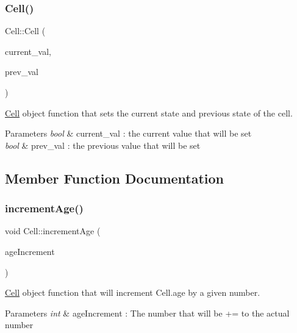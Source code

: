\subsubsection{\texorpdfstring{Cell()}{Cell()}}
{\footnotesize\ttfamily Cell\+::\+Cell (\begin{DoxyParamCaption}\item[{bool}]{current\+\_\+val,  }\item[{bool}]{prev\+\_\+val }\end{DoxyParamCaption})}



\mbox{\hyperlink{class_cell}{Cell}} object function that sets the current state and previous state of the cell. 


\begin{DoxyParams}{Parameters}
{\em bool} & current\+\_\+val \+: the current value that will be set \\
\hline
{\em bool} & prev\+\_\+val \+: the previous value that will be set \\
\hline
\end{DoxyParams}


\subsection{Member Function Documentation}
\mbox{\label{class_cell_a289682e9815c9e72f85ee21153688d3f}} 
\subsubsection{\texorpdfstring{increment\+Age()}{incrementAge()}}
{\footnotesize\ttfamily void Cell\+::increment\+Age (\begin{DoxyParamCaption}\item[{int}]{age\+Increment }\end{DoxyParamCaption})}



\mbox{\hyperlink{class_cell}{Cell}} object function that will increment Cell.\+age by a given number. 


\begin{DoxyParams}{Parameters}
{\em int} & age\+Increment \+: The number that will be += to the actual number \\
\hline
\end{DoxyParams}
\mbox{\label{class_cell_a4fc1b2e37891b5844cc11a0820ca6173}} 
